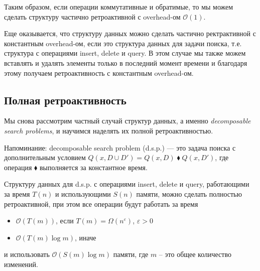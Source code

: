 Таким образом, если операции коммутативные и обратимые, то мы можем сделать структуру частично ретроактивной с overhead-ом $\mathcal{O}(1)$.

Еще оказывается, что структуру данных можно сделать частично ректрактивной с константным overhead-ом, если это структура данных для задачи поиска, 
т.е. структура с операциями insert, delete и query.
В этом случае мы также можем вставлять и удалять элементы только в последний момент времени и благодаря этому получаем ретроактивность с константным overhead-ом.


\subsection*{Полная ретроактивность}

Мы снова рассмотрим частный случай структур данных, а именно {\it decomposable search problems}, и научимся наделять их полной ретроактивностью. 

Напоминание: decomposable search problem (d.s.p.) --- это задача поиска с дополнительным условием $Q(x, D \cup D') = Q(x, D) \; \blacklozenge \; Q(x, D')$, 
где операция $\blacklozenge$ выполняется за константное время.

\begin{theorem} 

Структуру данных для d.s.p. с операциями insert, delete и query, работающими за время $T(n)$ и использующими $S(n)$ памяти, можно сделать полностью ретроактивной,
при этом все операции будут работать за время

\end{theorem}

\begin{itemize}

\item $\mathcal{O}(T(m))$, если $T(m) = \Omega(n^{\varepsilon})$, $\varepsilon > 0$
\item $\mathcal{O}(T(m) \log m)$, иначе

\end{itemize}

и использовать $\mathcal{O}(S(m) \log m)$ памяти, где $m$ -- это общее количество изменений.

